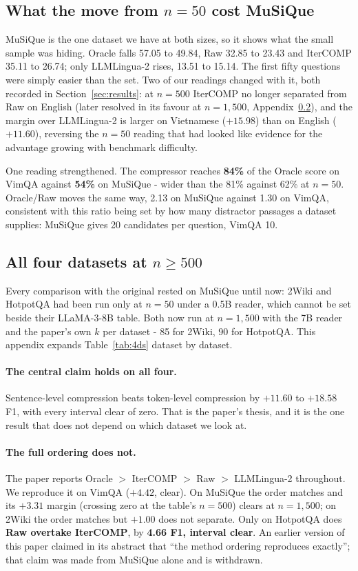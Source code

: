 \documentclass[11pt]{article}
\begin{document}
\subsection{What the move from $n=50$ cost MuSiQue}
\label{app:mq500}

MuSiQue is the one dataset we have at both sizes, so it shows what the small
sample was hiding. Oracle falls 57.05 to 49.84, Raw 32.85 to 23.43 and IterCOMP
35.11 to 26.74; only LLMLingua-2 rises, 13.51 to 15.14. The first fifty
questions were simply easier than the set. Two of our readings changed with it,
both recorded in Section~\ref{sec:results}: at $n=500$ IterCOMP no longer
separated from Raw on English (later resolved in its favour at $n=1{,}500$,
Appendix~\ref{app:4ds}), and the margin over LLMLingua-2 is larger on Vietnamese
($+15.98$) than on English ($+11.60$), reversing the $n=50$ reading that had
looked like evidence for the advantage growing with benchmark difficulty.

One reading strengthened. The compressor reaches \textbf{84\%} of the Oracle
score on VimQA against \textbf{54\%} on MuSiQue - wider than the 81\%
against 62\% at $n=50$. Oracle/Raw moves the same way, 2.13 on MuSiQue against
1.30 on VimQA, consistent with this ratio being set by how many distractor
passages a dataset supplies: MuSiQue gives 20 candidates per question, VimQA 10.

\subsection{All four datasets at $n\ge500$}
\label{app:4ds}

Every comparison with the original rested on MuSiQue until now: 2Wiki and
HotpotQA had been run only at $n=50$ under a 0.5B reader, which cannot be set
beside their LLaMA-3-8B table. Both now run at $n=1{,}500$ with the 7B reader and
the paper's own $k$ per dataset - 85 for 2Wiki, 90 for HotpotQA. This appendix
expands Table~\ref{tab:4ds} dataset by dataset.

\paragraph{The central claim holds on all four.} Sentence-level compression beats
token-level compression by $+11.60$ to $+18.58$ F1, with every interval clear of
zero. That is the paper's thesis, and it is the one result that does not depend
on which dataset we look at.

\paragraph{The full ordering does not.} The paper reports
Oracle $>$ IterCOMP $>$ Raw $>$ LLMLingua-2 throughout. We reproduce it on VimQA
($+4.42$, clear). On MuSiQue the order matches and its $+3.31$ margin (crossing
zero at the table's $n=500$) clears at $n=1{,}500$; on 2Wiki the order matches but
$+1.00$ does not separate. Only on HotpotQA does \textbf{Raw overtake IterCOMP},
by \textbf{4.66 F1, interval clear}. An earlier version of this paper claimed in its abstract that
``the method ordering reproduces exactly''; that claim was made from MuSiQue
alone and is withdrawn.
\end{document}
